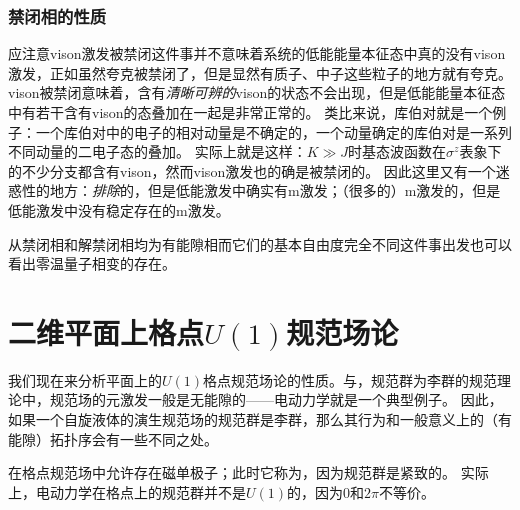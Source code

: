 \subsubsection{禁闭相的性质}

应注意vison激发被禁闭这件事并不意味着系统的低能能量本征态中真的没有vison激发，正如虽然夸克被禁闭了，但是显然有质子、中子这些粒子的地方就有夸克。
vison被禁闭意味着，含有\emph{清晰可辨的}vison的状态不会出现，但是低能能量本征态中有若干含有vison的态叠加在一起是非常正常的。
类比来说，库伯对就是一个例子：一个库伯对中的电子的相对动量是不确定的，一个动量确定的库伯对是一系列不同动量的二电子态的叠加。
实际上就是这样：$K \gg J$时基态波函数在$\sigma^z$表象下的不少分支都含有vison，然而vison激发也的确是被禁闭的。
因此这里又有一个迷惑性的地方：\emph{排除}的，但是低能激发中确实有m激发；（很多的）m激发的，但是低能激发中没有稳定存在的m激发。

从禁闭相和解禁闭相均为有能隙相而它们的基本自由度完全不同这件事出发也可以看出零温量子相变的存在。





\section{二维平面上格点$U(1)$规范场论}

我们现在来分析平面上的$U(1)$格点规范场论的性质。与，规范群为李群的规范理论中，规范场的元激发一般是无能隙的——电动力学就是一个典型例子。
因此，如果一个自旋液体的演生规范场的规范群是李群，那么其行为和一般意义上的（有能隙）拓扑序会有一些不同之处。

在格点规范场中允许存在磁单极子；此时它称为，因为规范群是紧致的。
实际上，电动力学在格点上的规范群并不是$U(1)$的，因为$0$和$2\pi$不等价。
